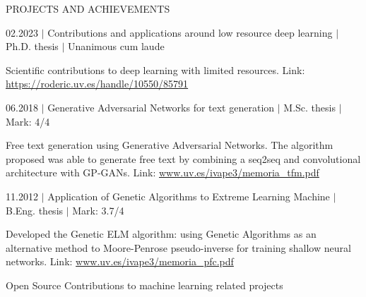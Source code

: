 \documentclass{resume} %
\begin{document}
\begin{rSection}{PROJECTS AND ACHIEVEMENTS}


\begin{rSubsection}{02.2023 $|$ Contributions and applications around low resource deep learning    $|$  \textnormal{Ph.D. thesis  $|$  Unanimous cum laude}}{}{}{}  
	
	\vspace{-3pt}
	
	\item Scientific contributions to deep learning with limited resources. Link: 
	\href{https://roderic.uv.es/handle/10550/85791}{https://roderic.uv.es/handle/10550/85791}
	
\end{rSubsection}
\vspace{-6pt}
\begin{rSubsection}{06.2018 $|$ Generative Adversarial Networks for text generation  $|$  \textnormal{M.Sc. thesis  $|$  Mark: 4/4}}{}{}{}  %

\vspace{-3pt}

\item Free text generation using Generative Adversarial Networks. The algorithm proposed was able to generate free text by combining a seq2seq and convolutional architecture with GP-GANs. Link: \href{https://www.uv.es/ivape3/memoria_tfm.pdf}{www.uv.es/ivape3/memoria\_tfm.pdf}

\end{rSubsection}

\vspace{-6pt}

\begin{rSubsection}{11.2012 $|$ Application of Genetic Algorithms to Extreme Learning Machine  $|$  \textnormal{B.Eng. thesis  $|$  Mark: 3.7/4}}
{}{}{}

\vspace{-3pt}

\item Developed the Genetic ELM algorithm: using Genetic Algorithms as an alternative method to Moore-Penrose pseudo-inverse for training shallow neural networks. Link: \href{https://www.uv.es/ivape3/memoria_pfc.pdf}{www.uv.es/ivape3/memoria\_pfc.pdf}

\end{rSubsection}

\vspace{-6pt}

\begin{rSubsection}{Open Source Contributions to machine learning related projects}
	{}{}{}


\end{rSubsection}
\end{rSection}
\end{document}
